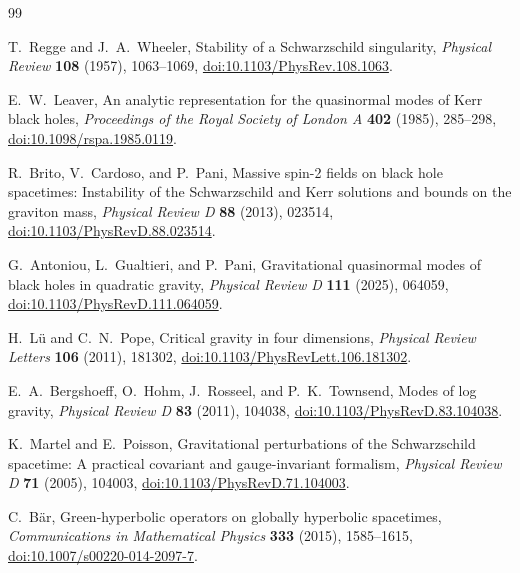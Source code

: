 \documentclass[11pt]{article}
\theoremstyle{remark}
\begin{document}
\begin{thebibliography}{99}

T.~Regge and J.~A.~Wheeler,
\newblock Stability of a Schwarzschild singularity,
\newblock \emph{Physical Review} \textbf{108} (1957), 1063--1069,
\newblock \href{https://doi.org/10.1103/PhysRev.108.1063}
{doi:10.1103/PhysRev.108.1063}.

E.~W.~Leaver,
\newblock An analytic representation for the quasinormal modes of Kerr black
holes,
\newblock \emph{Proceedings of the Royal Society of London A}
\textbf{402} (1985), 285--298,
\newblock \href{https://doi.org/10.1098/rspa.1985.0119}
{doi:10.1098/rspa.1985.0119}.

R.~Brito, V.~Cardoso, and P.~Pani,
\newblock Massive spin-2 fields on black hole spacetimes:
Instability of the Schwarzschild and Kerr solutions and bounds on the graviton
mass,
\newblock \emph{Physical Review D} \textbf{88} (2013), 023514,
\newblock \href{https://doi.org/10.1103/PhysRevD.88.023514}
{doi:10.1103/PhysRevD.88.023514}.

G.~Antoniou, L.~Gualtieri, and P.~Pani,
\newblock Gravitational quasinormal modes of black holes in quadratic gravity,
\newblock \emph{Physical Review D} \textbf{111} (2025), 064059,
\newblock \href{https://doi.org/10.1103/PhysRevD.111.064059}
{doi:10.1103/PhysRevD.111.064059}.

H.~L\"u and C.~N.~Pope,
\newblock Critical gravity in four dimensions,
\newblock \emph{Physical Review Letters} \textbf{106} (2011), 181302,
\newblock \href{https://doi.org/10.1103/PhysRevLett.106.181302}
{doi:10.1103/PhysRevLett.106.181302}.

E.~A.~Bergshoeff, O.~Hohm, J.~Rosseel, and P.~K.~Townsend,
\newblock Modes of log gravity,
\newblock \emph{Physical Review D} \textbf{83} (2011), 104038,
\newblock \href{https://doi.org/10.1103/PhysRevD.83.104038}
{doi:10.1103/PhysRevD.83.104038}.

K.~Martel and E.~Poisson,
\newblock Gravitational perturbations of the Schwarzschild spacetime: A
practical covariant and gauge-invariant formalism,
\newblock \emph{Physical Review D} \textbf{71} (2005), 104003,
\newblock \href{https://doi.org/10.1103/PhysRevD.71.104003}
{doi:10.1103/PhysRevD.71.104003}.

C.~B\"ar,
\newblock Green-hyperbolic operators on globally hyperbolic spacetimes,
\newblock \emph{Communications in Mathematical Physics}
\textbf{333} (2015), 1585--1615,
\newblock \href{https://doi.org/10.1007/s00220-014-2097-7}
{doi:10.1007/s00220-014-2097-7}.


\end{thebibliography}
\end{document}
